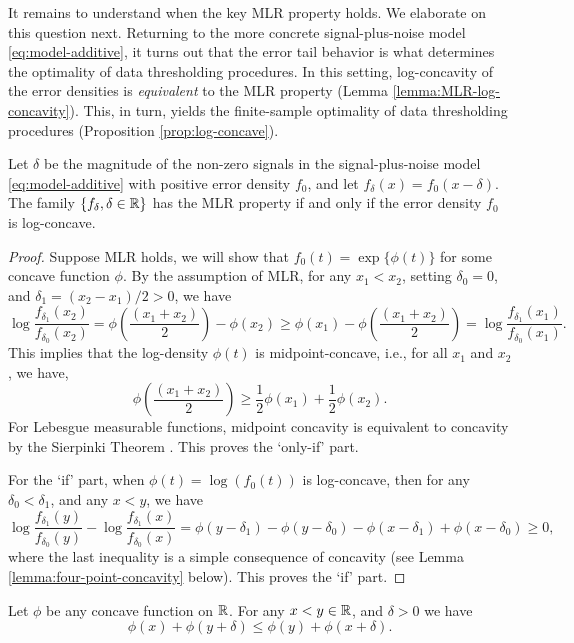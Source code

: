 It remains to understand when the key MLR property holds.  We elaborate on this question next.
Returning to the more concrete signal-plus-noise model \eqref{eq:model-additive}, it turns out that the error tail behavior is what determines the optimality of data thresholding procedures.
In this setting, log-concavity of the error densities is \emph{equivalent} to the MLR property (Lemma \ref{lemma:MLR-log-concavity}). This, in turn, yields the finite-sample optimality of data thresholding procedures (Proposition \ref{prop:log-concave}).

\begin{lemma} \label{lemma:MLR-log-concavity}
Let $\delta$ be the magnitude of the non-zero signals in the signal-plus-noise model \eqref{eq:model-additive} with positive error density $f_0$, and let $f_\delta(x) = f_0(x-\delta)$.
The family $\{f_\delta, \delta \in \mathbb R\}$ has the MLR property if and only if the error density $f_0$ is log-concave.
\end{lemma}

\begin{proof}%
Suppose MLR holds, we will show that $f_0(t) = \exp\{\phi(t)\}$ for some concave function $\phi$.
By the assumption of MLR, for any $x_1 < x_2$, setting $\delta_0 = 0$, and $\delta_1 = (x_2 - x_1)/2 > 0$, we have
\begin{equation*}
    \log{\frac{f_{\delta_1}(x_2)}{f_{\delta_0}(x_2)}}
    = \phi\left(\frac{(x_1+x_2)}{2}\right)- \phi(x_2) 
    \ge \phi(x_1)- \phi\left(\frac{(x_1+x_2)}{2}\right) 
    = \log{\frac{f_{\delta_1}(x_1)}{f_{\delta_0}(x_1)}}.
\end{equation*}
This implies that the log-density $\phi(t)$ is midpoint-concave, i.e., for all $x_1$ and $x_2$, we have,
\begin{equation}
    \phi\left(\frac{(x_1+x_2)}{2}\right) 
    \ge \frac{1}{2} \phi(x_1) + \frac{1}{2} \phi(x_2).
\end{equation}
For Lebesgue measurable functions, midpoint concavity is equivalent to concavity by the Sierpinki Theorem \citep[see, e.g., Sec I.3 of][]{donoghue2014distributions}. This proves the `only-if' part.

For the `if' part, when  $\phi(t) = \log{(f_0(t))}$ is log-concave, then for any $\delta_0 < \delta_1$, and any $x<y$, we have
\begin{equation} \label{eq:concavity-implies-MLR}
    \log{\frac{f_{\delta_1}(y)}{f_{\delta_0}(y)}} - \log{\frac{f_{\delta_1}(x)}{f_{\delta_0}(x)}}
    = \phi(y-\delta_1) - \phi(y-\delta_0) - \phi(x-\delta_1) + \phi(x-\delta_0) \ge 0,
\end{equation}
where the last inequality is a simple consequence of concavity (see Lemma \ref{lemma:four-point-concavity} below). This proves the `if' part.
\end{proof}
\begin{lemma} \label{lemma:four-point-concavity}
Let $\phi$ be any concave function on $\mathbb R$. For any $x<y\in\mathbb R$, and $\delta>0$ we have
$$
\phi(x) + \phi(y+\delta) \le \phi(y) + \phi(x+\delta).
$$
\end{lemma}

